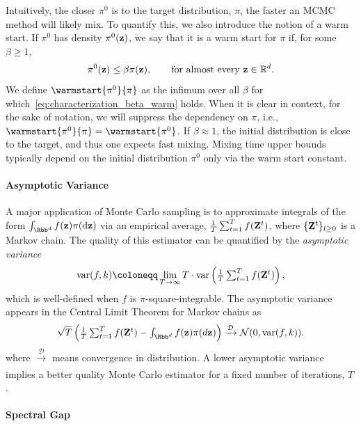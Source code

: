 \documentclass[onefignum,onetabnum]{siamonline250211}
\renewcommand{\d} {{\rm d}}                                %
\newcommand{\bfZ}{{\bf Z}}
\newcommand{\bfz}{{\bf z}}
\begin{document}
Intuitively, the closer $\pi^0$ is to the target distribution, $\pi$, the faster an MCMC method will likely mix. To quantify this, we also introduce the notion of a warm start. If $\pi^0$ has density $\pi^0(\bfz)$, we say that it is a warm start for $\pi$ if, for some $\beta \ge 1$,
\begin{align}
\label{eq:characterization_beta_warm}
    \pi^0(\bfz)\le \beta \pi(\bfz),\qquad\text{for almost every }\bfz\in\mathbb{R}^d.
\end{align}
We define $\warmstart{\pi^0}{\pi}$ as the infimum over all $\beta$ for which~\eqref{eq:characterization_beta_warm} holds.
When it is clear in context, for the sake of notation, we will suppress the dependency on $\pi$, i.e., $\warmstart{\pi^0}{\pi} = \warmstart{\pi^0}$.
If $\beta \approx 1$, the initial distribution is close to the target, and thus one expects fast mixing. 
Mixing time upper bounds typically depend on the initial distribution $\pi^0$ only via the warm start constant.

%
%

\paragraph{Asymptotic Variance}
A major application of Monte Carlo sampling is to approximate integrals of the form $\int_{\Rbb^d}f(\bfz)\pi(\d\bfz)$ via an
%
empirical average, $\frac{1}{T}\sum_{t=1}^Tf(\bfZ^t)$, where $\{\bfZ^t\}_{t \ge 0}$ is a Markov chain.
%
The quality of this estimator can be quantified by the \textit{asymptotic variance}
\begin{align}\label{eq:asymptotic_variance}
    \operatorname{var}(f,k) \coloneqq \lim_{T\to\infty}T\cdot \operatorname{var}\left(\textstyle \frac{1}{T}\sum_{t=1}^Tf(\bfZ^t)\right),
\end{align}
which is well-defined when $f$ is $\pi$-square-integrable.
%
The asymptotic variance appears in the Central Limit Theorem for Markov chains as
\begin{align*}
    \sqrt{T}\left(\textstyle \frac{1}{T}\sum_{t=1}^Tf(\bfZ^t)-\int_{\Rbb^d}f(\bfz)\pi(d\bfz)\right)\xrightarrow[]{\mathcal{D}}\mathcal{N}(0,\operatorname{var}(f,k)).
\end{align*}
where $\xrightarrow[]{\mathcal{D}}$ means convergence in distribution.
A lower asymptotic variance implies a better quality  Monte Carlo estimator for a fixed number of iterations, $T$.


\paragraph{Spectral Gap}
\end{document}
